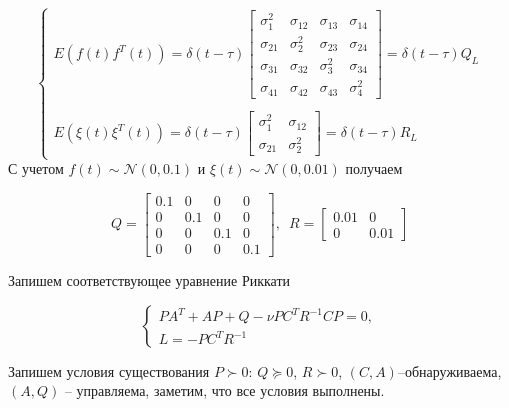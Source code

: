 \begin{equation}
	\begin{cases}
		E \left( f(t) f^T(t) \right) = \delta (t - \tau)
		\begin{bmatrix}
			\sigma^2_1 & \sigma_{12} & \sigma_{13} & \sigma_{14}\\
			\sigma_{21} & \sigma^2_{2} & \sigma_{23} & \sigma_{24}\\
			\sigma_{31} & \sigma_{32} & \sigma^2_{3} & \sigma_{34}\\
			\sigma_{41} & \sigma_{42} & \sigma_{43} & \sigma^2_{4}
		\end{bmatrix} = \delta(t-\tau) Q_L\\\\
		E \left( \xi(t) \xi^T(t) \right) =
		\delta (t - \tau)
		\begin{bmatrix}
			\sigma^2_1 & \sigma_{12}\\
			\sigma_{21} & \sigma^2_{2} 
		\end{bmatrix} = \delta(t-\tau) R_L
	\end{cases}
\end{equation}
С учетом $ f(t) \sim \mathcal{N}(0,0.1)$ и $ \xi(t)  \sim \mathcal{N}(0,0.01)$ получаем

\begin{equation}
	Q = \begin{bmatrix}
		0.1 & 0 & 0 & 0\\
		0 & 0.1 & 0 & 0\\
		0 & 0 & 0.1 & 0\\
		0 & 0 & 0 & 0.1
	\end{bmatrix}, \, \, \, 
	R=
	\begin{bmatrix}
		0.01 & 0\\
		0 & 0.01
	\end{bmatrix}
\end{equation}




Запишем соответствующее уравнение Риккати

\begin{equation}
	\begin{cases}
		PA^T+AP+Q-\nu PC^TR^{-1}CP=0,\\
		L = -PC^TR^{-1}
	\end{cases}
\end{equation}

Запишем условия существования $P \succ 0$: $Q \succeq 0$, $R \succ 0$, $(C,A)$--обнаруживаема, $(A,Q)$ -- управляема, заметим, что все условия выполнены.


